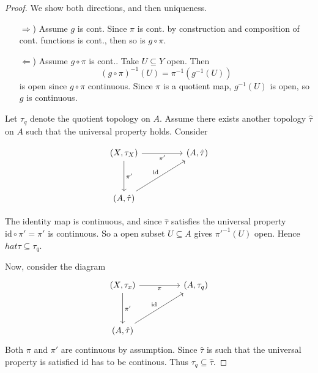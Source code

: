 \begin{proof}
  We show both directions, and then uniqueness.

   \begin{enumerate}
   \item[\( \Rightarrow \))] Assume \( g \) is cont.
     Since \( \pi \) is cont.
     by construction and composition of cont. functions
     is cont., then so is \( g \circ \pi \).
   \item[\( \Leftarrow \))] Assume \( g \circ \pi \) is cont..
     Take \( U \subseteq Y \) open. Then
     \[
      {(g \circ \pi)}^{-1} (U)  = {\pi}^{-1} ({g}^{-1}(U) )
      \]
     is open since \( g \circ \pi \) continuous.
     Since \( \pi \) is a quotient map, \( {g}^{-1} (U) \)
     is open, so \( g \) is continuous.
   \end{enumerate}

  Let \( \tau_q \) denote the quotient topology on \( A \).
  Assume there exists another topology \( \hat{\tau} \) on \( A \)
  such that the universal property holds.
  Consider
  
\[\begin{tikzcd}
	{(X, \tau_X)} && {(A, \hat{\tau})} \\
	\\
	{(A, \hat{\tau})}
	\arrow["{\pi'}"', from=1-1, to=1-3]
	\arrow["{\pi'}", from=1-1, to=3-1]
	\arrow["{\text{id}}", from=3-1, to=1-3]
\end{tikzcd}\]

  The identity map is continuous, and since
  \( \hat{\tau} \) satisfies the universal property
  \( \text{id} \circ \pi' = \pi'  \) is continuous.
  So a open subset \( U \subseteq A \) gives \( {\pi'}^{-1}(U)  \)
  open. Hence \(hat{\tau} \subseteq \tau_q \).

  Now, consider the diagram
\[\begin{tikzcd}
	{(X, \tau_x)} && {(A, \tau_q)} \\
	\\
	{(A, \hat{\tau})}
	\arrow["\pi"', from=1-1, to=1-3]
	\arrow["{\pi'}", from=1-1, to=3-1]
	\arrow["{\text{id}}", from=3-1, to=1-3]
\end{tikzcd}\]
Both \( \pi \) and \( \pi' \) are continuous by assumption.
Since \( \hat{\tau} \) is such that the universal property is satisfied
\( \text{id} \) has to be continous. Thus \( \tau_q \subseteq \hat{\tau} \).
\end{proof}

